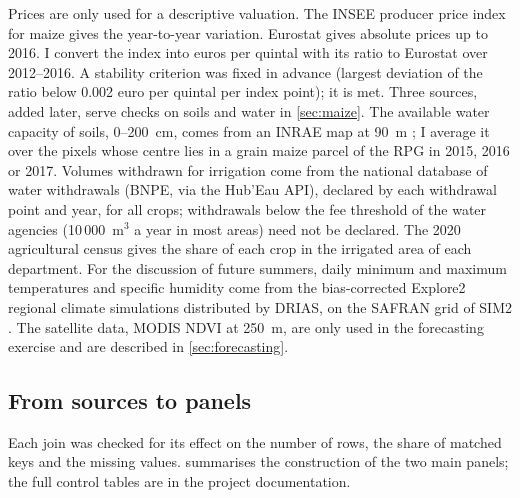 Prices are only used for a descriptive valuation. The INSEE producer price index for maize gives the year-to-year variation. Eurostat gives absolute prices up to 2016. I convert the index into euros per quintal with its ratio to Eurostat over 2012--2016. A stability criterion was fixed in advance (largest deviation of the ratio below 0.002 euro per quintal per index point); it is met. Three sources, added later, serve checks on soils and water in \cref{sec:maize}. The available water capacity of soils, 0--200~cm, comes from an INRAE map at 90~m \parencite[data: doi:10.15454/9IRARJ]{romandobarco2019}; I average it over the pixels whose centre lies in a grain maize parcel of the RPG in 2015, 2016 or 2017. Volumes withdrawn for irrigation come from the national database of water withdrawals (BNPE, via the Hub'Eau API), declared by each withdrawal point and year, for all crops; withdrawals below the fee threshold of the water agencies (10\,000~m$^3$ a year in most areas) need not be declared. The 2020 agricultural census gives the share of each crop in the irrigated area of each department. For the discussion of future summers, daily minimum and maximum temperatures and specific humidity come from the bias-corrected Explore2 regional climate simulations distributed by DRIAS, on the SAFRAN grid of SIM2 \parencite{drias2022}. The satellite data, MODIS NDVI at 250~m, are only used in the forecasting exercise and are described in \cref{sec:forecasting}.

\subsection{From sources to panels}

Each join was checked for its effect on the number of rows, the share of matched keys and the missing values.  summarises the construction of the two main panels; the full control tables are in the project documentation.

